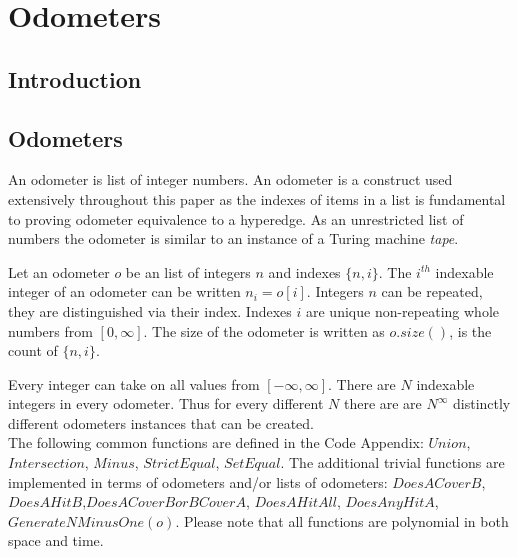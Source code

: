 \chapter{Odometers}


\section{Introduction}

\section{Odometers }

An odometer is list of integer numbers. An odometer is a construct used extensively throughout this paper as the indexes of items in a list is fundamental to proving odometer equivalence to a hyperedge. As an unrestricted list of numbers the odometer is similar to an instance of a Turing machine \textit{tape}. \\

\begin{definition}
Let an odometer $o$ be an list of integers $n$ and indexes $\{n,i\}$. The $i^{th}$ indexable integer of an odometer can be written $n_i = o[i]$. Integers $n$ can be repeated, they are distinguished via their index. Indexes $i$ are unique non-repeating whole numbers from $[0,\infty]$. The size of the odometer is written as $o.size()$, is the count of $\{n,i\}$. \\
\end{definition}

Every integer can take on all values from $[-\infty,\infty]$. There are $N$ indexable integers in every odometer. Thus for every different $N$ there are are $N^{\infty}$ distinctly different odometers instances that can be created. \cite{Odometer:Fuchs}\\


The following common functions are defined in the Code Appendix: $Union$, $Intersection$, $Minus$, $StrictEqual$, $SetEqual$. The additional trivial functions are implemented in terms of odometers and/or lists of odometers: $DoesACoverB$, $DoesAHitB$,$DoesACoverBorBCoverA$, $DoesAHitAll$, $DoesAnyHitA$, $GenerateNMinusOne(o)$. Please note that all functions are polynomial in both space and time.\\
